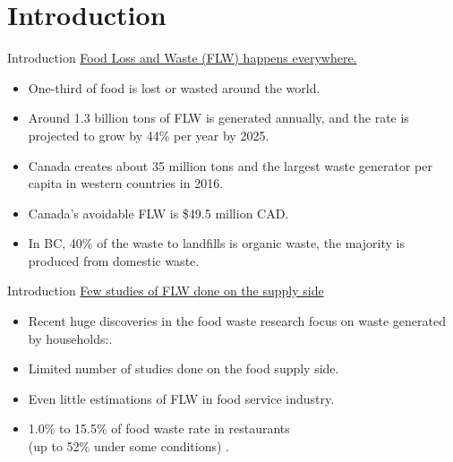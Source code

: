\documentclass{beamer}
\begin{document}
\section{Introduction}
\begin{frame}{Introduction}
    \underline{Food Loss and Waste (FLW) happens everywhere.}
    \begin{itemize}
        \item One-third of food is lost or wasted around the world\cite{Gustavsson2011-em}.
        \item Around 1.3 billion tons of FLW is generated annually, and the rate is projected to grow by 44\% per year by 2025\cite{Blakeney2019-jk}.
    \end{itemize}
    \begin{itemize}
        \item Canada creates about 35 million tons and the largest waste generator per capita in western countries in 2016\cite{Nzwc2016-jl}.
        \item Canada's avoidable FLW is \$49.5 million CAD\cite{Gooch2019-gd}.
    \end{itemize}
    \begin{itemize}
        \item In BC, 40\% of the waste to landfills is organic waste, the majority is produced from domestic waste\cite{BCwaste}.
    \end{itemize}
\end{frame}

\begin{frame}{Introduction}
    \underline{Few studies of FLW done on the supply side}
    \begin{itemize}
        \item Recent huge discoveries in the food waste research focus on waste generated by households:\cite{Aschemann-Witzel2015-xj,Lusk2017-xm,Von_Massow2019-qa}.
    \end{itemize}

    \begin{itemize}
        \item Limited number of studies done on the food supply side.
        \item Even little estimations of FLW in food service industry.
        \item 1.0\% to 15.5\% of food waste rate in restaurants\\(up to 52\% under some conditions) \cite{Ministry_of_Environment_And_Climate_Change_Strategy2018-sk}. 
    \end{itemize}
\end{frame}
\end{document}
